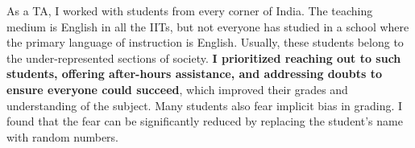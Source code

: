 \documentclass[11pt,a4paper,times]{moderncv} %
\begin{document}
As a TA, I worked with students from every corner of India. The teaching medium is English in all the IITs, but not everyone has studied in a school where the primary language of instruction is English. Usually, these students belong to the under-represented sections of society. \textbf{I prioritized reaching out to such students, offering after-hours assistance, and addressing doubts to ensure everyone could succeed}, which improved their grades and understanding of the subject. Many students also fear implicit bias in grading. I found that the fear can be significantly reduced by replacing the student's name with random numbers.\\
\end{document}
